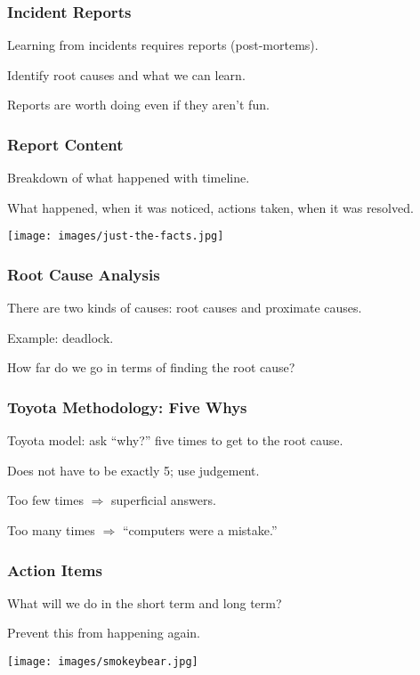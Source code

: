 \begin{frame}
\frametitle{Incident Reports}

Learning from incidents requires reports (post-mortems).

Identify root causes and what we can learn. 

Reports are worth doing even if they aren't fun.

\end{frame}


\begin{frame}
\frametitle{Report Content}

Breakdown of what happened with timeline.

What happened, when it was noticed, actions taken, when it was resolved.

\begin{center}
	\texttt{[image: images/just-the-facts.jpg]}
\end{center}


\end{frame}


\begin{frame}
\frametitle{Root Cause Analysis}

There are two kinds of causes: root causes and proximate causes.

Example: deadlock.

How far do we go in terms of finding the root cause?

\end{frame}


\begin{frame}
\frametitle{Toyota Methodology: Five Whys}

Toyota model: ask ``why?'' five times to get to the root cause.

Does not have to be exactly 5; use judgement.

Too few times $\Rightarrow$ superficial answers.

Too many times $\Rightarrow$ ``computers were a mistake.''

\end{frame}


\begin{frame}
\frametitle{Action Items}

What will we do in the short term and long term?

Prevent this from happening again.

\begin{center}
	\texttt{[image: images/smokeybear.jpg]}
\end{center}

\end{frame}



